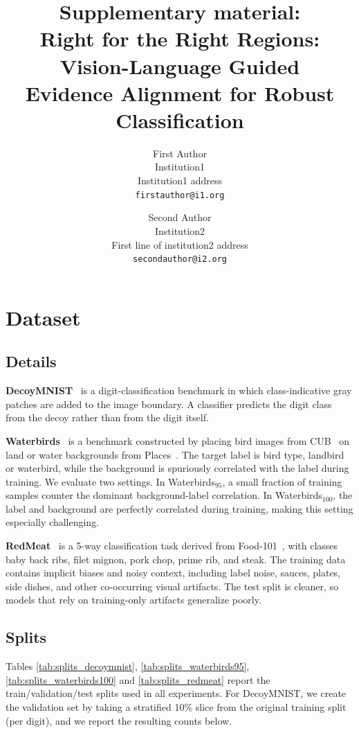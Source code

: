 \documentclass[10pt,twocolumn,letterpaper]{article}
\title{Supplementary material:\\ Right for the Right Regions: Vision-Language Guided \\
Evidence Alignment for Robust Classification}
\author{First Author\\
Institution1\\
Institution1 address\\
{\tt\small firstauthor@i1.org}
\and
Second Author\\
Institution2\\
First line of institution2 address\\
{\tt\small secondauthor@i2.org}
}
\begin{document}
\maketitle

\section{Dataset}
\subsection{Details}\label{datasetdetails}
\textbf{DecoyMNIST}~\cite{erion2021improving} is a digit-classification benchmark in which class-indicative gray patches are added to the image boundary. A classifier predicts the digit class from the decoy rather than from the digit itself.

\textbf{Waterbirds}~\cite{sagawa2019distributionally}  is a benchmark constructed by placing bird images from CUB~\cite{wah2011caltech}  on land or water backgrounds from Places~\cite{zhou2017places}. The target label is bird type, landbird or waterbird, while the background is spuriously correlated with the label during training. We evaluate two settings. In Waterbirds$_{95}$, a small fraction of training samples counter the dominant background-label correlation. In Waterbirds$_{100}$, the label and background are perfectly correlated during training, making this setting especially challenging.

\textbf{RedMeat}~\cite{petryk2022guiding} is a 5-way classification task derived from Food-101~\cite{bossard2014food}, with classes baby back ribs, filet mignon, pork chop, prime rib, and steak. The training data contains implicit biases and noisy context, including label noise, sauces, plates, side dishes, and other co-occurring visual artifacts. The test split is cleaner, so models that rely on training-only artifacts generalize poorly.
\subsection{Splits}
\label{sec:supp_dataset_splits}

Tables \ref{tab:splits_decoymnist}, \ref{tab:splits_waterbirds95}, \ref{tab:splits_waterbirds100} and \ref{tab:splits_redmeat} report the train/validation/test splits used in all experiments. For DecoyMNIST, we create the validation set by taking a stratified 10\% slice from the original training split (per digit), and we report the resulting counts below.
\end{document}
